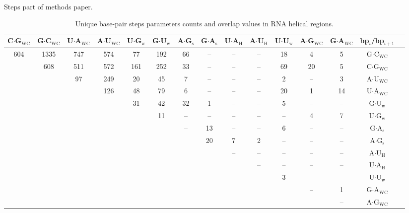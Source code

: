 Steps part of methods paper.




\begin{sidewaystable}[htbp]
\begin{center}
\begin{tabular}{|c|c|c|c|c|c|c|c|c|c|c|c|c|c|c|}
\hline
C$\cdot$G$_{\text{WC}}$ & G$\cdot$C$_{\text{WC}}$ & U$\cdot$A$_{\text{WC}}$ &
A$\cdot$U$_{\text{WC}}$ & U$\cdot$G$_{\text{w}}$ &
G$\cdot$U$_{\text{w}}$ & A$\cdot$G$_{\text{s}}$ &
G$\cdot$A$_{\text{s}}$ & U$\cdot$A$_{\text{H}}$ &
A$\cdot$U$_{\text{H}}$ & U$\cdot$U$_{\text{w}}$ &
A$\cdot$G$_{\text{WC}}$ & G$\cdot$A$_{\text{WC}}$ & bp$_{i}$/bp$_{i+1}$\\ 
\hline  
604 & 1335 & 747 & 574 & 77 & 192 & 66 & -- & -- & -- & 18 & 4 & 5 & G$\cdot$C$_{\text{WC}}$\\
 & 608 & 511 & 572 & 161 & 252 & 33 & -- & -- & -- & 69 & 20 & 5 & C$\cdot$G$_{\text{WC}}$\\
 &  & 97 & 249 & 20 & 45 & 7 & -- & -- & -- & 2 & -- & 3 & A$\cdot$U$_{\text{WC}}$\\
 &  &  & 126 & 48 & 79 & 6 & -- & -- & -- & 20 & 1 & 14 & U$\cdot$A$_{\text{WC}}$\\
 &  &  &  & 31 & 42 & 32 & 1 & -- & -- & 5 & -- & -- & G$\cdot$U$_{\text{w}}$\\
 &  &  &  &  & 11 & -- & -- & -- & -- & -- & 4 & 7 & U$\cdot$G$_{\text{w}}$\\
 &  &  &  &  &  & -- & 13 & -- & -- & 6 & -- & -- & G$\cdot$A$_{\text{s}}$\\ 
 &  &  &  &  &  &  & 20 & 7 & 2 & -- & -- & -- & A$\cdot$G$_{\text{s}}$\\
 &  &  &  &  &  &  &  & -- & -- & -- & -- & -- & A$\cdot$U$_{\text{H}}$\\
 &  &  &  &  &  &  &  &  & -- & -- & -- & -- & U$\cdot$A$_{\text{H}}$\\
 &  &  &  &  &  &  &  &  &  & 3 & -- & -- & U$\cdot$U$_{\text{w}}$\\
 &  &  &  &  &  &  &  &  &  &  & -- & 1 & G$\cdot$A$_{\text{WC}}$\\
 &  &  &  &  &  &  &  &  &  &  &  & -- & A$\cdot$G$_{\text{WC}}$\\
\hline
\end{tabular}
\caption{Unique base-pair steps parameters counts and overlap values
  in RNA helical regions.}
\label{tab:91steps}
\end{center}
\end{sidewaystable}



